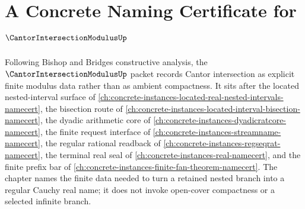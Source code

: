 \chapter{A Concrete Naming Certificate for $\CantorIntersectionModulusUp$}
\label{ch:concrete-instances-cantor-intersection-modulus-namecert}

Following Bishop and Bridges constructive analysis, the $\CantorIntersectionModulusUp$ packet records Cantor intersection as explicit finite modulus data rather than as ambient compactness. It sits after the located nested-interval surface of \autoref{ch:concrete-instances-located-real-nested-intervals-namecert}, the bisection route of \autoref{ch:concrete-instances-located-interval-bisection-namecert}, the dyadic arithmetic core of \autoref{ch:concrete-instances-dyadicratcore-namecert}, the finite request interface of \autoref{ch:concrete-instances-streamname-namecert}, the regular rational readback of \autoref{ch:concrete-instances-regseqrat-namecert}, the terminal real seal of \autoref{ch:concrete-instances-real-namecert}, and the finite prefix bar of \autoref{ch:concrete-instances-finite-fan-theorem-namecert}. The chapter names the finite data needed to turn a retained nested branch into a regular Cauchy real name; it does not invoke open-cover compactness or a selected infinite branch.

